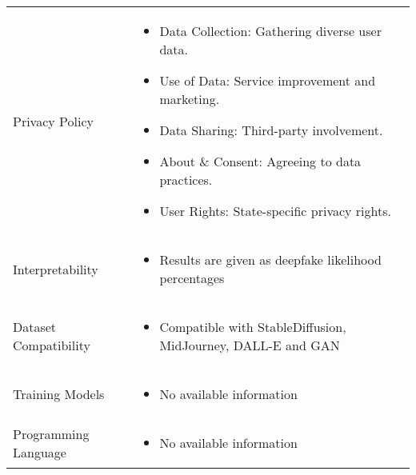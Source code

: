 \begin{table}[htpb]
\begin{tabularx}{\textwidth}{l X}
		\addlinespace
		Privacy Policy               & \begin{itemize}
			                               \item Data Collection: Gathering diverse user data.
			                               \item Use of Data: Service improvement and marketing.
			                               \item Data Sharing: Third-party involvement.
			                               \item About \& Consent: Agreeing to data practices.
			                               \item User Rights: State-specific privacy rights.
		                               \end{itemize}                  \\
		\addlinespace
		Interpretability             & \begin{itemize}
			                               \item Results are given as deepfake likelihood percentages
		                               \end{itemize}             \\
		\addlinespace
		Dataset Compatibility        & \begin{itemize}
			                               \item Compatible with StableDiffusion, MidJourney, DALL-E and \ac{GAN}
		                               \end{itemize} \\
		\addlinespace
		Training Models              & \begin{itemize}
			                               \item No available information
		                               \end{itemize}                                         \\
		\addlinespace
		Programming Language         & \begin{itemize}
			                               \item No available information
		                               \end{itemize}                                         \\
		\bottomrule
	\end{tabularx}
\end{table}